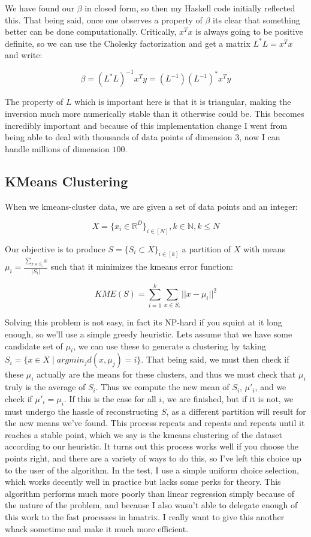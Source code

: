 \documentclass{article}
\begin{document}
We have found our $\beta$ in closed form, so then my Haskell code initially reflected this.
That being said, once one observes a property of $\beta$ its clear that something better
can be done computationally. Critically, $x^Tx$ is always going to be positive definite, so
we can use the Cholesky factorization and get a matrix $L^*L = x^Tx$ and write:

\[ \beta = (L^*L)^{-1}x^Ty = (L^{-1})(L^{-1})^*x^Ty \]

The property of $L$ which is important here is that it is triangular, making the inversion
much more numerically stable than it otherwise could be. This becomes incredibly important
and because of this implementation change I went from being able to deal with thousands of
data points of dimension $3$, now I can handle millions of dimension $100$.

\subsection{KMeans Clustering}

When we kmeans-cluster data, we are given a set of data points and an integer:

\[X = \{x_i \in \mathbb{R}^D\}_{i \in [N]}, k \in \mathbb{N}, k \leq N \]

Our objective is to produce $S = \{S_i \subset X\}_{i \in [k]}$ a partition of $X$ with means
$\mu_i = \frac{\sum_{x \in S_i} x}{|S_i|}$ such that it 
minimizes the kmeans error function:

\[ KME(S) = \sum_{i = 1}^k \sum_{x \in S_i} ||x - \mu_i||^2 \]

Solving this problem is not easy, in fact its NP-hard if you squint at it long enough, so
we'll use a simple greedy heuristic. Lets assume that we have some candidate set of $\mu_i$,
we can use these to generate a clustering by taking 
$S_i = \{ x \in X \mid argmin_j d(x, \mu_j) = i\}$. That being said, we must then check if
these $\mu_i$ actually are the means for these clusters, and thus we must check that $\mu_i$
truly is the average of $S_i$. Thus we compute the new mean of $S_i$, $\mu'_i$, and we check
if $\mu'_i = \mu_i$. If this is the case for all $i$, we are finished, but if it is not, we
must undergo the hassle of reconstructing $S$, as a different partition will result for the
new means we've found. This process repeats and repeats and repeats until it reaches a stable
point, which we say is the kmeans clustering of the dataset according to our heuristic. It
turns out this process works well if you choose the points right, and there are a variety of
ways to do this, so I've left this choice up to the user of the algorithm. In the test, I use
a simple uniform choice selection, which works decently well in practice but lacks some perks
for theory. This algorithm performs much more poorly than linear regression simply because of
the nature of the problem, and because I also wasn't able to delegate enough of this work to 
the fast processes in hmatrix. I really want to give this another whack sometime and make it
much more efficient. 
\end{document}
